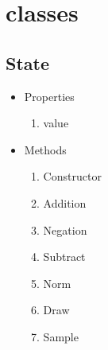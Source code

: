 \documentclass[10pt,a4paper]{article}
\author{Ali-akbar Agha-mohammadi}
\begin{document}

\section{classes}

\subsection{State}
\begin{itemize}
\item Properties
\begin{enumerate}
\item value
\end{enumerate}

\item Methods
\begin{enumerate}
\item Constructor
\item Addition
\item Negation
\item Subtract
\item Norm
\item Draw
\item Sample
\end{enumerate}
\end{itemize}
\end{document}
